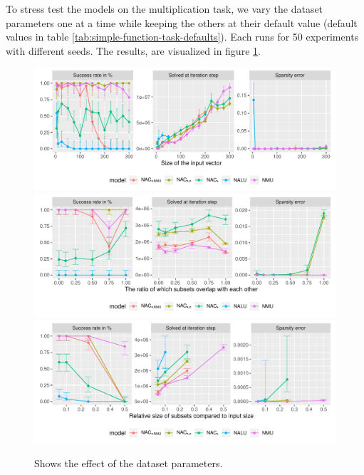 To stress test the models on the multiplication task, we vary the dataset parameters one at a time while keeping the others at their default value (default values in table \ref{tab:simple-function-task-defaults}). Each runs for 50 experiments with different seeds. The results, are visualized in figure \ref{fig:simple-function-static-dataset-parameters-boundary}.

\begin{figure}[h]
\centering
\includegraphics[width=\linewidth,trim={0 1.3cm 0 0},clip]{results/simple_function_static_mul_input_size.pdf}
\includegraphics[width=\linewidth,trim={0 1.3cm 0 0.809cm},clip]{results/simple_function_static_mul_overlap.pdf}
\includegraphics[width=\linewidth,trim={0 0 0 0.809cm},clip]{results/simple_function_static_mul_subset.pdf}
\caption{Shows the effect of the dataset parameters.}
\label{fig:simple-function-static-dataset-parameters-boundary}
\end{figure}

